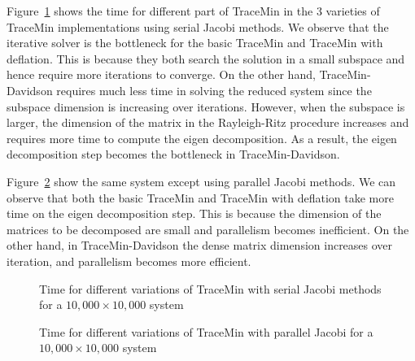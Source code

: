 Figure~\ref{fig:comp_s} shows the time for different part of TraceMin in the 3 varieties of TraceMin implementations
using serial Jacobi methods. We observe that the iterative solver is the bottleneck for the basic TraceMin and
TraceMin with deflation. This is because they both search the solution in a small subspace and hence require more
iterations to converge. On the other hand, TraceMin-Davidson requires much less time in solving the reduced system
since the subspace dimension is increasing over iterations. However, when the subspace is larger, the dimension of
the matrix in the Rayleigh-Ritz procedure increases and requires more time to compute the eigen decomposition. As a
result, the eigen decomposition step becomes the bottleneck in TraceMin-Davidson.

Figure~\ref{fig:comp_p} show the same system except using parallel Jacobi methods. We can observe that both the
basic TraceMin and TraceMin with deflation take more time on the eigen decomposition step. This is because the
dimension of the matrices to be decomposed are small and parallelism becomes inefficient. On the other hand, in
TraceMin-Davidson the dense matrix dimension increases over iteration, and parallelism becomes more efficient.

\begin{figure}[htbp]
	\centering
	\caption{Time for different variations of TraceMin with serial Jacobi methods for a $10,000 \times 10,000$ system}
  \label{fig:comp_s}
\end{figure}

\begin{figure}[htbp]
	\centering
	\caption{Time for different variations of TraceMin with parallel Jacobi for a $10,000 \times 10,000$ system}
  \label{fig:comp_p}
\end{figure}


